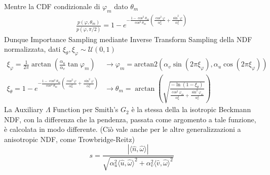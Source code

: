 Mentre la CDF condizionale di $\varphi_m$ dato $\theta_m$
\begin{align}
	\frac{p(\varphi,\theta_m)}{p(\varphi,\pi/2)}=1-e^{-\frac{1-\cos^2\theta_m}{\cos^2\theta_m}\left(\frac{\cos^2\varphi}{\alpha_u^2}%
		+\frac{\sin^2\varphi}{\alpha_v^2}\right)}
\end{align}
Dunque Importance Sampling mediante Inverse Transform Sampling della NDF normalizzata, dati $\xi_\theta,\xi_\varphi\sim\mathcal{U}(0,1)$
\begin{align}
	\xi_\varphi=\frac{1}{2\pi}\arctan(\frac{\alpha_u}{\alpha_v}\tan\varphi_m)&\longrightarrow%
		\varphi_m=\mathrm{arctan2}(\alpha_v\sin(2\pi\xi_\varphi),\alpha_u\cos(2\pi\xi_\varphi)) \\
	\xi_\theta=1-e^{-\frac{1-\cos^2\theta_m}{\cos^2\theta_m}\left(\frac{\cos^2\varphi}{\alpha_u^2}%
		+\frac{\sin^2\varphi}{\alpha_v^2}\right)}&\longrightarrow\theta_m=\arctan\left(\sqrt{\frac{-\ln(1-\xi_\theta)}%
			{\frac{\cos^2\varphi_m}{\alpha_u^2}+\frac{\sin^2\varphi_m}{\alpha_v^2}}}\right)
\end{align}
La Auxiliary $\Lambda$ Function per Smith's $G_2$ \`e la stessa della la isotropic Beckmann NDF, con la differenza che la pendenza, passata 
come argomento a tale funzione, \`e calcolata in modo differente. (Ci\`o vale anche per le altre generalizzazioni a anisotropic NDF, come 
Trowbridge-Reitz)
\begin{equation}
	s=\frac{|\langle\hat{n},\hat{\omega}\rangle|}{\sqrt{\alpha_u^2\langle\hat{u},\hat{\omega}\rangle^2+\alpha_v^2\langle\hat{v},\hat{\omega}\rangle^2}}
\end{equation}
